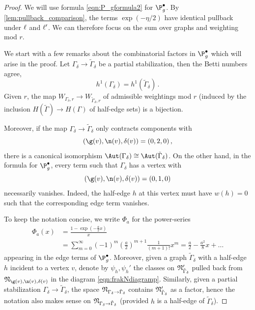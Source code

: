 \begin{proof}
We will use  formula \eqref{eqn:P_gformula2}
for $\P_g^\bullet$. By \cref{lem:pullback_comparison}, the terms $\exp(- \eta/2)$ have identical pullback under $\ell$ and $\ell'$. We can therefore
focus on the sum over graphs and weighting mod $r$.

We start with a few remarks about the combinatorial factors in $\P_g^\bullet$ which will arise in the proof. Let $\Gamma_{\delta}\to\tilde{\Gamma}_{\delta}$ be a partial stabilization, then the Betti numbers agree,
$$h^1(\Gamma_\delta) = h^1(\tilde \Gamma_\delta)\, .$$
Given $r$, the map $W_{\Gamma_\delta,r} \to W_{\tilde \Gamma_\delta, r}$ of admissible weightings mod $r$ (induced by the inclusion $H(\tilde \Gamma) \to H(\Gamma)$ of half-edge sets) is a bijection.

Moreover, if the map $\Gamma_{\delta}\to\tilde{\Gamma}_{\delta}$ only contracts components with $$(\g(v),\n(v),\delta(v))=(0,2,0)\,,$$ there is a canonical isomorphism $\Aut(\Gamma_\delta) \cong \Aut(\tilde \Gamma_\delta)$. On the other hand, in the formula for $\P_g^\bullet$, every term such that $\Gamma_\delta$ has a vertex with $$(\g(v), \n(v), \delta(v))=(0,1,0)$$ necessarily vanishes. Indeed, the half-edge $h$ at this vertex must have $w(h)=0$ such that the corresponding edge term vanishes.

To keep the notation concise, we write $\Phi_{a}$ for the power-series
\begin{align*}
\Phi_{a}(x)&= \frac{1-\exp({-\frac{a}{2}}x)}{x}\\ &= \sum_{m=0}^\infty (-1)^m (\frac{a}{2})^{m+1} \frac{1}{(m+1)!}x^m = \frac{a}{2} - \frac{a^2}{8} x + \ldots
\end{align*}
appearing in the edge terms of $\P_g^\bullet$. Moreover, given a graph $\tilde \Gamma_\delta$ with a half-edge $h$ incident to a vertex $v$, denote by $\psi_h, \psi_h'$ the classes on $\frak N'_{\tilde \Gamma_\delta}$ pulled back from $\frak N_{\g(v),\n(v),\delta(v)}$ in the diagram \eqref{eqn:frakNdiagramp}. Similarly, given a partial stabilization $\Gamma_\delta \to \tilde \Gamma_\delta$, the space $\frak N_{\Gamma_\delta \to \tilde \Gamma_\delta}$ contains $\frak N'_{\tilde \Gamma_\delta}$ as a factor, hence the notation also makes sense on $\frak N_{\Gamma_\delta \to \tilde \Gamma_\delta}$ (provided $h$ is a half-edge of $\tilde \Gamma_\delta$).


\end{proof}
